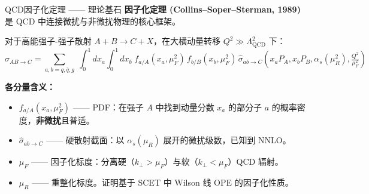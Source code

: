 \documentclass[10pt,aspectratio=169]{beamer}
\newcommand{\lqcd}{\Lambda_{\mathrm{QCD}}}
\begin{document}
\begin{frame}{QCD因子化定理 —— 理论基石}
  \textbf{因子化定理 (Collins--Soper--Sterman, 1989)} 是 QCD 中连接微扰与非微扰物理的核心框架。

  对于高能强子-强子散射 $A + B \to C + X$，在大横动量转移 $Q^2 \gg \lqcd^2$ 下：
  {\small
  \begin{equation*}
    \sigma_{AB \to C} = \sum_{a,b=q,\bar{q},g}\;
    \int_0^1 dx_a \int_0^1 dx_b\;
    f_{a/A}(x_a, \mu_F^2)\,
    f_{b/B}(x_b, \mu_F^2)\,
    \hat{\sigma}_{ab \to C}\!\left(x_a P_A, x_b P_B, \alpha_s(\mu_R^2), \tfrac{Q^2}{\mu_F^2}\right)
  \end{equation*}}

  \textbf{各分量含义：}
  \begin{itemize}
    \item $f_{a/A}(x_a, \mu_F^2)$ —— PDF：在强子 $A$ 中找到动量分数 $x_a$ 的部分子 $a$ 的概率密度，\textbf{非微扰}且普适。
    \item $\hat{\sigma}_{ab \to C}$ —— 硬散射截面：以 $\alpha_s(\mu_R)$ 展开的微扰级数，已知到 NNLO。
    \item $\mu_F$ —— 因子化标度：分离硬（$k_\perp > \mu_F$）与软（$k_\perp < \mu_F$）QCD 辐射。
    \item $\mu_R$ —— 重整化标度。证明基于 SCET 中 Wilson 线 OPE 的因子化性质。
  \end{itemize}
\end{frame}
\end{document}
